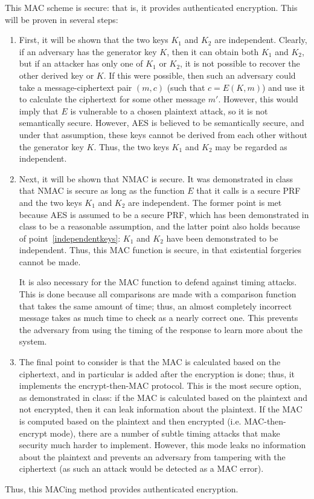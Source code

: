 \documentclass{amsart}
\begin{document}
This MAC scheme is secure: that is, it provides authenticated encryption. This will be proven in several steps:
\begin{enumerate}
\item\label{independentkeys} First, it will be shown that the two keys $K_1$ and $K_2$ are independent. Clearly, if an adversary has the generator key $K$, then it can obtain both $K_1$ and $K_2$, but if an attacker has only one of $K_1$ or $K_2$, it is not possible to recover the other derived key or $K$. If this were possible, then such an adversary could take a message-ciphertext pair $(m,c)$ (such that $c = E(K,m)$) and use it to calculate the ciphertext for some other message $m'$. However, this would imply that $E$ is vulnerable to a chosen plaintext attack, so it is not semantically secure. However, AES is believed to be semantically secure, and under that assumption, these keys cannot be derived from each other without the generator key $K$. Thus, the two keys $K_1$ and $K_2$ may be regarded as independent.
\item Next, it will be shown that NMAC is secure. It was demonstrated in class that NMAC is secure as long as the function $E$ that it calls is a secure PRF and the two keys $K_1$ and $K_2$ are independent. The former point is met because AES is assumed to be a secure PRF, which has been demonstrated in class to be a reasonable assumption, and the latter point also holds because of point~\ref{independentkeys}: $K_1$ and $K_2$ have been demonstrated to be independent. Thus, this MAC function is secure, in that existential forgeries cannot be made.

It is also necessary for the MAC function to defend against timing attacks. This is done because all comparisons are made with a comparison function that takes the same amount of time; thus, an almost completely incorrect message takes as much time to check as a nearly correct one. This prevents the adversary from using the timing of the response to learn more about the system.
\item The final point to consider is that the MAC is calculated based on the ciphertext, and in particular is added after the encryption is done; thus, it implements the encrypt-then-MAC protocol. This is the most secure option, as demonstrated in class: if the MAC is calculated based on the plaintext and not encrypted, then it can leak information about the plaintext. If the MAC is computed based on the plaintext and then encrypted (i.e. MAC-then-encrypt mode), there are a number of subtle timing attacks that make security much harder to implement. However, this mode leaks no information about the plaintext and prevents an adversary from tampering with the ciphertext (as such an attack would be detected as a MAC error).
\end{enumerate}
Thus, this MACing method provides authenticated encryption.
\end{document}

